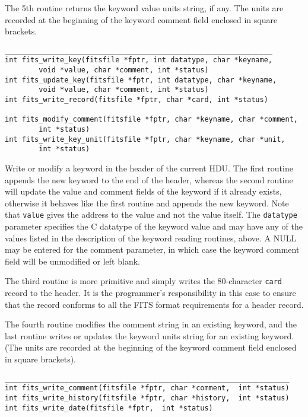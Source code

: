 \documentclass[11pt]{article}
\begin{document}
The 5th routine returns the keyword value units string, if any.
The units are recorded at the beginning of the keyword comment field
enclosed in square brackets.
\begin{verbatim}
_______________________________________________________________
int fits_write_key(fitsfile *fptr, int datatype, char *keyname, 
        void *value, char *comment, int *status)
int fits_update_key(fitsfile *fptr, int datatype, char *keyname,
        void *value, char *comment, int *status)
int fits_write_record(fitsfile *fptr, char *card, int *status)

int fits_modify_comment(fitsfile *fptr, char *keyname, char *comment,
        int *status)
int fits_write_key_unit(fitsfile *fptr, char *keyname, char *unit,
        int *status)

\end{verbatim}

Write or modify a keyword  in the header of the current HDU.  The
first routine appends the new keyword to the end of the header, whereas
the second routine will update the value and comment fields of the
keyword if it already exists, otherwise it behaves like the first
routine and appends the new keyword.  Note that {\tt value} gives the
address to the value and not the value itself.  The {\tt datatype}
parameter specifies the C datatype of the keyword value and may have
any of the values listed in the description of the keyword reading
routines, above.  A NULL may be entered for the comment parameter, in
which case the  keyword comment field will be unmodified or left
blank.

The third routine is more primitive and simply writes the 80-character
{\tt card} record to the header.  It is the programmer's responsibility
in this case to ensure that the record conforms to all the FITS format
requirements for a header record.

The fourth routine modifies the comment string in an existing keyword,
and the last routine writes or updates the keyword units string for an
existing keyword.  (The units are recorded at the beginning of the
keyword comment field enclosed in square brackets).

\begin{verbatim}
___________________________________________________________________
int fits_write_comment(fitsfile *fptr, char *comment,  int *status)
int fits_write_history(fitsfile *fptr, char *history,  int *status)
int fits_write_date(fitsfile *fptr,  int *status)
\end{verbatim}
\end{document}
